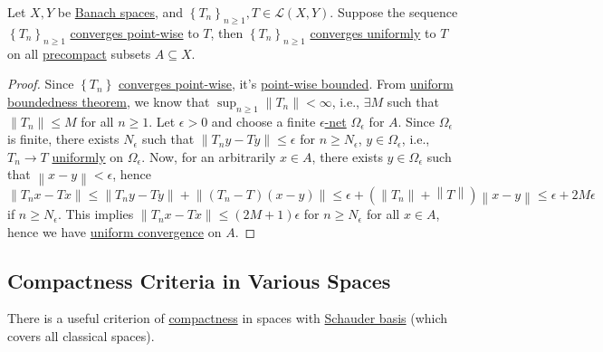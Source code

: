 \begin{theorem}\label{thm:convergence-on-compact-set}
	Let \(X, Y\) be \hyperref[def:Banach-space]{Banach spaces}, and \(\left\{ T_n \right\} _{n \geq 1}, T\in \mathcal{L} (X, Y)\). Suppose the sequence \(\left\{ T_n \right\} _{n \geq 1}\) \hyperref[def:point-wise-convergence]{converges point-wise} to \(T\), then \(\left\{ T_n \right\}_{n \geq 1}\) \hyperref[def:uniformly-convergence]{converges uniformly} to \(T\) on all \hyperref[def:precompact]{precompact} subsets \(A \subseteq X\).
\end{theorem}
\begin{proof}
	Since \(\left\{ T_n \right\} \) \hyperref[def:point-wise-convergence]{converges point-wise}, it's \hyperref[def:point-wise-bounded]{point-wise bounded}. From \hyperref[thm:uniform-boundedness]{uniform boundedness theorem}, we know that \(\sup _{n \geq 1} \left\lVert T_n\right\rVert < \infty \), i.e., \(\exists M\) such that \(\left\lVert T_n\right\rVert \leq M\) for all \(n \geq 1\). Let \(\epsilon > 0\) and choose a finite \hyperref[def:eps-net]{\(\epsilon \)-net} \(\Omega _\epsilon \)  for \(A\). Since \(\Omega _{\epsilon }\) is finite, there exists \(N_{\epsilon } \) such that \(\left\lVert T_n y - Ty\right\rVert \leq \epsilon\) for \(n \geq N_{\epsilon } \), \(y\in \Omega _{\epsilon }\), i.e., \(T_n \to T\) \hyperref[def:uniformly-convergence]{uniformly} on \(\Omega _\epsilon \). Now, for an arbitrarily \(x\in A\), there exists \(y\in \Omega _\epsilon \) such that \(\left\lVert x - y\right\rVert < \epsilon \), hence
	\[
		\left\lVert T_n x - Tx\right\rVert \leq \left\lVert T_n y - T y\right\rVert + \left\lVert (T_n - T)(x - y)\right\rVert \leq \epsilon + \left( \left\lVert T_n\right\rVert + \left\lVert T\right\rVert  \right) \left\lVert x - y \right\rVert \leq \epsilon + 2M\epsilon
	\]
	if \(n \geq N_{\epsilon } \). This implies \(\left\lVert T_n x - Tx\right\rVert \leq (2M+1)\epsilon \) for \(n \geq N_{\epsilon } \) for all \(x\in A\), hence we have \hyperref[def:uniformly-convergence]{uniform convergence} on \(A\).
\end{proof}

\subsection{Compactness Criteria in Various Spaces}
There is a useful criterion of \hyperref[def:compact]{compactness} in spaces with \hyperref[def:Schauder-basis]{Schauder basis} (which covers all classical spaces).

